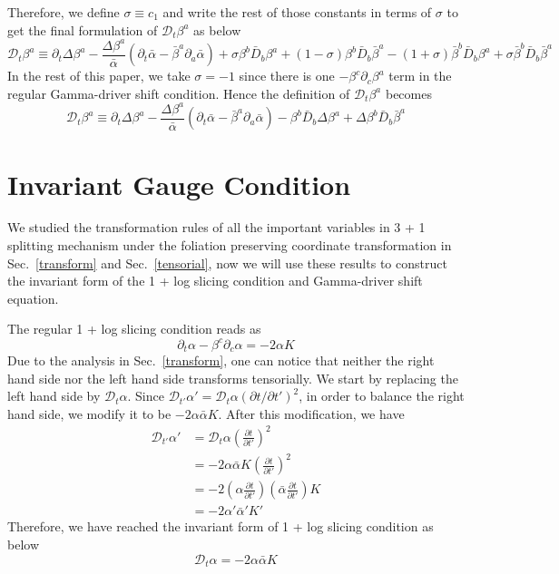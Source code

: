 \documentclass[letterpaper,nofootinbib,prd,amsmath,onecolumn]{revtex4-1}
\begin{document}
Therefore, we define $\sigma \equiv c_{1}$ and write the rest of those constants in terms of $\sigma$ to get the final formulation of $\mathscr{D}_{t}\beta^{a}$ as below
\begin{equation}
\mathscr{D}_{t}\beta^{a} \equiv \partial_{t}\Delta \beta^{a} - \frac{\Delta \beta^{a}}{{\bar \alpha}}(\partial_{t}{\bar \alpha} - {\bar \beta}^{a}\partial_{a}{\bar \alpha}) + \sigma\beta^{b}{\bar D}_{b}\beta^{a} + (1-\sigma)\beta^{b}{\bar D}_{b}{\bar \beta}^{a} - (1 + \sigma){\bar \beta}^{b}{\bar D}_{b}\beta^{a} + \sigma{\bar \beta}^{b}{\bar D}_{b}{\bar \beta}^{a}
\end{equation}
In the rest of this paper, we take $\sigma = -1$ since there is one $-\beta^{c}\partial_{c}\beta^{a}$ term in the regular Gamma-driver shift condition. Hence the definition of $\mathscr{D}_{t}\beta^{a}$ becomes
\begin{equation}
\mathscr{D}_{t}\beta^{a} \equiv \partial_{t}\Delta \beta^{a} - \frac{\Delta \beta^{a}}{{\bar \alpha}}(\partial_{t}{\bar \alpha} - {\bar \beta}^{a}\partial_{a}{\bar \alpha}) - \beta^{b}{\bar D}_{b}\Delta \beta^{a} + \Delta \beta^{b}{\bar D}_{b}{\bar \beta}^{a}
\end{equation}
\section{Invariant Gauge Condition}\label{gauge}
We studied the transformation rules of all the important variables in 3 + 1 splitting mechanism under the foliation preserving coordinate transformation in Sec.~\ref{transform} and Sec.~\ref{tensorial}, now we will use these results to construct the invariant form of the 1 + log slicing condition and Gamma-driver shift equation. 

The regular 1 + log slicing condition reads as
\begin{equation}\label{1 + log slicing}
\partial_{t}\alpha - \beta^{c}\partial_{c}\alpha = -2\alpha K
\end{equation}
Due to the analysis in Sec.~\ref{transform}, one can notice that neither the right hand side nor the left hand side transforms tensorially. We start by replacing the left hand side by $\mathscr{D}_{t}\alpha$. Since $\mathscr{D}_{t'}\alpha' = \mathscr{D}_{t}\alpha(\partial t/\partial t')^{2}$, in order to balance the right hand side, we modify it to be $-2\alpha {\bar \alpha}K$. After this modification, we have
\begin{align*}
\mathscr{D}_{t'}\alpha' & = \mathscr{D}_{t}\alpha\left(\frac{\partial t}{\partial t'}\right)^{2}\\
& = -2\alpha{\bar \alpha}K\left(\frac{\partial t}{\partial t'}\right)^{2}\\
& = -2\left(\alpha\frac{\partial t}{\partial t'}\right)\left({\bar \alpha}\frac{\partial t}{\partial t'}\right)K\\
& = -2\alpha'{\bar \alpha}'K'
\end{align*}
Therefore, we have reached the invariant form of 1 + log slicing condition as below
\begin{equation}\label{invariant 1 + log slicing}
\mathscr{D}_{t}\alpha = -2\alpha{\bar \alpha}K
\end{equation}
\end{document}
